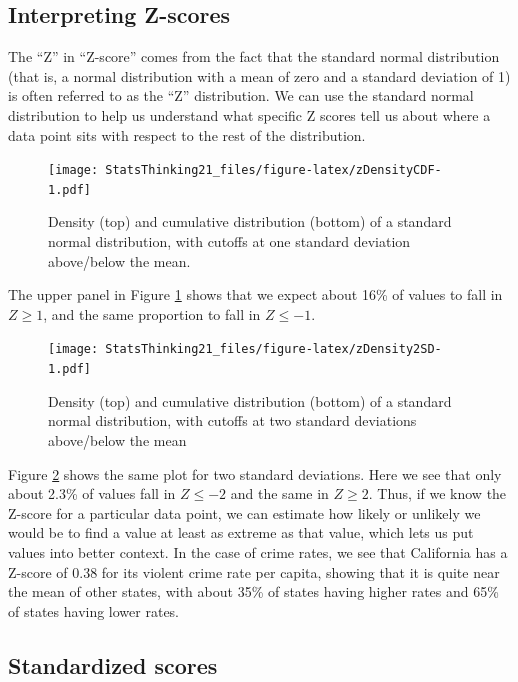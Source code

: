 \documentclass[12pt,]{book}
\theoremstyle{definition}
\theoremstyle{definition}
\theoremstyle{definition}
\theoremstyle{remark}
\begin{document}
\hypertarget{interpreting-z-scores}{%
\subsection{Interpreting Z-scores}\label{interpreting-z-scores}}

The ``Z'' in ``Z-score'' comes from the fact that the standard normal distribution (that is, a normal distribution with a mean of zero and a standard deviation of 1) is often referred to as the ``Z'' distribution. We can use the standard normal distribution to help us understand what specific Z scores tell us about where a data point sits with respect to the rest of the distribution.

\begin{figure}
\centering
\texttt{[image: StatsThinking21\_files/figure-latex/zDensityCDF-1.pdf]}
\caption{\label{fig:zDensityCDF}Density (top) and cumulative distribution (bottom) of a standard normal distribution, with cutoffs at one standard deviation above/below the mean.}
\end{figure}

The upper panel in Figure \ref{fig:zDensityCDF} shows that we expect about 16\% of values to fall in \(Z\ge 1\), and the same proportion to fall in \(Z\le -1\).

\begin{figure}
\centering
\texttt{[image: StatsThinking21\_files/figure-latex/zDensity2SD-1.pdf]}
\caption{\label{fig:zDensity2SD}Density (top) and cumulative distribution (bottom) of a standard normal distribution, with cutoffs at two standard deviations above/below the mean}
\end{figure}

Figure \ref{fig:zDensity2SD} shows the same plot for two standard deviations. Here we see that only about 2.3\% of values fall in \(Z \le -2\) and the same in \(Z \ge 2\). Thus, if we know the Z-score for a particular data point, we can estimate how likely or unlikely we would be to find a value at least as extreme as that value, which lets us put values into better context. In the case of crime rates, we see that California has a Z-score of 0.38 for its violent crime rate per capita, showing that it is quite near the mean of other states, with about 35\% of states having higher rates and 65\% of states having lower rates.

\hypertarget{standardized-scores}{%
\subsection{Standardized scores}\label{standardized-scores}}
\end{document}
